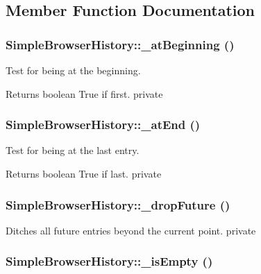 \subsection{Member Function Documentation}
\hypertarget{class_simple_browser_history_a04977574d4720fc63770afefce6aed39}{
\subsubsection[{\_\-atBeginning}]{\setlength{\rightskip}{0pt plus 5cm}SimpleBrowserHistory::\_\-atBeginning ()}}
\label{class_simple_browser_history_a04977574d4720fc63770afefce6aed39}
Test for being at the beginning. \begin{DoxyReturn}{Returns}
boolean True if first.  private 
\end{DoxyReturn}
\hypertarget{class_simple_browser_history_a8165fbf967fc0cdf2b626c8eb026ab72}{
\subsubsection[{\_\-atEnd}]{\setlength{\rightskip}{0pt plus 5cm}SimpleBrowserHistory::\_\-atEnd ()}}
\label{class_simple_browser_history_a8165fbf967fc0cdf2b626c8eb026ab72}
Test for being at the last entry. \begin{DoxyReturn}{Returns}
boolean True if last.  private 
\end{DoxyReturn}
\hypertarget{class_simple_browser_history_a5d40551c31b6a3a4f7d8db7bba45d18d}{
\subsubsection[{\_\-dropFuture}]{\setlength{\rightskip}{0pt plus 5cm}SimpleBrowserHistory::\_\-dropFuture ()}}
\label{class_simple_browser_history_a5d40551c31b6a3a4f7d8db7bba45d18d}
Ditches all future entries beyond the current point.  private \hypertarget{class_simple_browser_history_a563ca44364f4def86a41eb683ecd2cee}{
\subsubsection[{\_\-isEmpty}]{\setlength{\rightskip}{0pt plus 5cm}SimpleBrowserHistory::\_\-isEmpty ()}}
